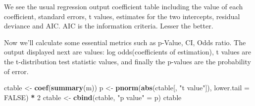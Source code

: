 \documentclass[]{article}
\newenvironment{Shaded}{\begin{snugshade}}{\end{snugshade}}
\newcommand{\KeywordTok}[1]{\textcolor[rgb]{0.13,0.29,0.53}{\textbf{#1}}}
\newcommand{\DataTypeTok}[1]{\textcolor[rgb]{0.13,0.29,0.53}{#1}}
\newcommand{\DecValTok}[1]{\textcolor[rgb]{0.00,0.00,0.81}{#1}}
\newcommand{\StringTok}[1]{\textcolor[rgb]{0.31,0.60,0.02}{#1}}
\newcommand{\OtherTok}[1]{\textcolor[rgb]{0.56,0.35,0.01}{#1}}
\newcommand{\OperatorTok}[1]{\textcolor[rgb]{0.81,0.36,0.00}{\textbf{#1}}}
\newcommand{\NormalTok}[1]{#1}
\begin{document}
We see the usual regression output coefficient table including the value
of each coefficient, standard errors, t values, estimates for the two
intercepts, residual deviance and AIC. AIC is the information criteria.
Lesser the better.

Now we'll calculate some essential metrics such as p-Value, CI, Odds
ratio. The output displayed next are values: log odds(coefficients of
estimation), t values are the t-distribution test statistic values, and
finally the p-values are the probability of error.

\begin{Shaded}
\begin{Highlighting}[]
\NormalTok{ctable <-}\StringTok{ }\KeywordTok{coef}\NormalTok{(}\KeywordTok{summary}\NormalTok{(m))}
\NormalTok{p <-}\StringTok{ }\KeywordTok{pnorm}\NormalTok{(}\KeywordTok{abs}\NormalTok{(ctable[, }\StringTok{"t value"}\NormalTok{]), }\DataTypeTok{lower.tail =} \OtherTok{FALSE}\NormalTok{) }\OperatorTok{*}\StringTok{ }\DecValTok{2}
\NormalTok{ctable <-}\StringTok{ }\KeywordTok{cbind}\NormalTok{(ctable, }\StringTok{"p value"}\NormalTok{ =}\StringTok{ }\NormalTok{p)}
\NormalTok{ctable}
\end{Highlighting}
\end{Shaded}
\end{document}
